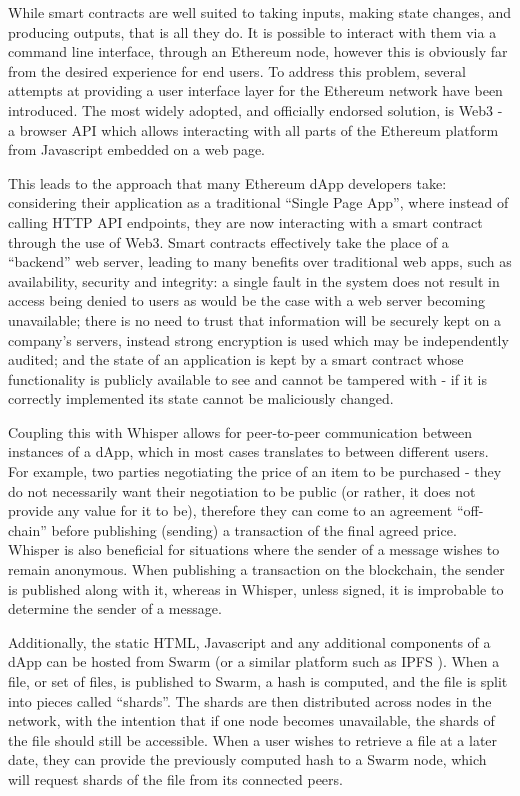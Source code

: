 While smart contracts are well suited to taking inputs, making state changes, and producing outputs, that is all they do. It is possible to interact with them via a command line interface, through an Ethereum node, however this is obviously far from the desired experience for end users. To address this problem, several attempts at providing a user interface layer for the Ethereum network have been introduced. The most widely adopted, and officially endorsed solution\cite{Web3Endorsement}, is Web3 - a browser API which allows interacting with all parts of the Ethereum platform from Javascript embedded on a web page.

This leads to the approach that many Ethereum dApp developers take: considering their application as a traditional “Single Page App”, where instead of calling HTTP API endpoints, they are now interacting with a smart contract through the use of Web3. Smart contracts effectively take the place of a “backend” web server, leading to many benefits over traditional web apps, such as availability, security and integrity: a single fault in the system does not result in access being denied to users as would be the case with a web server becoming unavailable; there is no need to trust that information will be securely kept on a company's servers, instead strong encryption is used which may be independently audited; and the state of an application is kept by a smart contract whose functionality is publicly available to see and cannot be tampered with - if it is correctly implemented its state cannot be maliciously changed.

Coupling this with Whisper allows for peer-to-peer communication between instances of a dApp, which in most cases translates to between different users. For example, two parties negotiating the price of an item to be purchased - they do not necessarily want their negotiation to be public (or rather, it does not provide any value for it to be), therefore they can come to an agreement “off-chain” before publishing (sending) a transaction of the final agreed price. Whisper is also beneficial for situations where the sender of a message wishes to remain anonymous. When publishing a transaction on the blockchain, the sender is published along with it, whereas in Whisper, unless signed, it is improbable to determine the sender of a message\cite{WhisperGethWiki}.

Additionally, the static HTML, Javascript and any additional components of a dApp can be hosted from Swarm (or a similar platform such as IPFS \cite{IPFS}). When a file, or set of files, is published to Swarm, a hash is computed, and the file is split into pieces called “shards”. The shards are then distributed across nodes in the network, with the intention that if one node becomes unavailable, the shards of the file should still be accessible. When a user wishes to retrieve a file at a later date, they can provide the previously computed hash to a Swarm node, which will request shards of the file from its connected peers.

